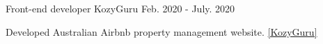 

\begin{cventries}

  \cventry
    {Front-end developer} %
    {\color{gray}KozyGuru}
    {}
    {Feb. 2020 - July. 2020} %
    {
      \begin{cvitems} %
        \item {Developed Australian Airbnb property management website.} \href{https://www.kozyguru.com/}{\color{ao}[KozyGuru]}
      \end{cvitems}
    }
\end{cventries}
